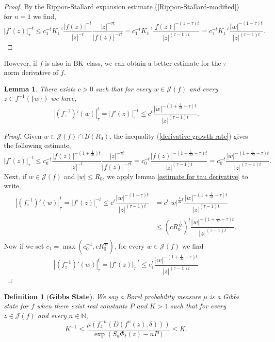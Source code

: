 \documentclass[12pt,reqno]{amsart}
\newtheorem{lemma}[theorem]{Lemma}
\newtheorem{definition}[theorem]{Definition}
\begin{document}
\begin{proof}
   By the Rippon-Stallard expansion estimate (\ref{Rippon-Stallard-modified}) for $n=1$ we find,
    $$|f'(z)|_{\tau}^{-t}\leq c_1^{-t} K_1^{-t} \dfrac{|f(z)|^{-t}}{|z|^{-t}}\dfrac{|z|^{-\tau t}}{|f(z)|^{-\tau t}}=c_1^{-t} K_1^{-t} \dfrac{|f(z)|^{-(1-\tau)t}}{|z|^{(\tau -1)t}}=c_1^{-t} K_1^{-t} \dfrac{|w|^{-(1-\tau)t}}{|z|^{(\tau -1)t}}.$$
\end{proof}
\noindent However, if $f$ is also in BK--class, we can obtain a better estimate for the $\tau-$norm derivative of $f$.
\begin{lemma}\label{estimate for tau derivative stronger}
    There exists $c>0$ such that for every $w \in \mathcal{J}(f)$ and every $z\in f^{-1}(\{w\})$ we have,
    $$\left|(f_z^{-1})'(w)\right|_{\tau}^{t}=|f'(z)|_{\tau}^{-t} \leq c^{t}\dfrac{|w|^{-(1+\frac{1}{M}-\tau)t}}{|z|^{(\tau-1)t}}.$$
\end{lemma}
\begin{proof}
    Given $w\in \mathcal{J}(f)\cap B(R_0)$, the inequality (\ref{derivative growth rate}) gives the following estimate,
    $$|f'(z)|_{\tau}^{-t}\leq c_0^{-t}\dfrac{|f(z)|^{-(1+\frac{1}{M})t}}{|z|^{-t}}\dfrac{|z|^{-\tau t}}{|f(z)|^{-\tau t}} = c_0^{-t}\dfrac{|f(z)|^{-(1+\frac{1}{M}-\tau)t}}{|z|^{(\tau-1)t}} =c_0^{-t}\dfrac{|w|^{-(1+\frac{1}{M}-\tau)t}}{|z|^{(\tau-1)t}}.$$
    Next, if $w\in \mathcal{J}(f)$ and $|w|\leq R_0$, we apply lemma \ref{estimate for tau derivative} to write,
    \begin{align*}
        \left|(f_z^{-1})'(w)\right|_{\tau}^{t}=|f'(z)|_{\tau}^{-t} \leq c^{t}\dfrac{|w|^{-(1-\tau)t}}{|z|^{(\tau-1)t}}& = c^t|w|^{\frac{1}{M}t}\dfrac{|w|^{-(1+\frac{1}{M}-\tau)t}}{|z|^{(\tau-1)t}}\\
        &\leq (cR_0^{\frac{1}{M}})^t\dfrac{|w|^{-(1+\frac{1}{M}-\tau)t}}{|z|^{(\tau-1)t}}.
    \end{align*}
    Now if we set $c_1=\max \left(c_0^{-1}, cR_0^{\frac{1}{M}} \right)$, for every $w \in \mathcal{J}(f)$ we find 
    $$\left|(f_z^{-1})'(w)\right|_{\tau}^{t}=|f'(z)|_{\tau}^{-t} \leq c_1^{t}\dfrac{|w|^{-(1+\frac{1}{M}-\tau)t}}{|z|^{(\tau-1)t}}$$
\end{proof}
\begin{definition}[\textbf{Gibbs State}]
    We say a Borel probability measure $\mu$ is a Gibbs state for $f$ when there exist real constants $P$ and $K>1$ such that for every $z \in \mathcal{J}(f)$ and every $n \in \mathbb{N}$, 
    $$K^{-1}\leq \dfrac{\mu \left(f_z^{-n}\left(D(f^n(z),\delta) \right) \right)}{\exp \left(S_n\Phi_t(z)-nP \right)} \leq K.$$
\end{definition}
\end{document}
